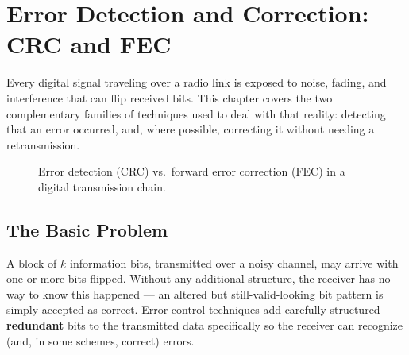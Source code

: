 \chapter{Error Detection and Correction: CRC and FEC}
\label{ch:error-control}

Every digital signal traveling over a radio link is exposed to noise,
fading, and interference that can flip received bits. This chapter
covers the two complementary families of techniques used to deal with
that reality: detecting that an error occurred, and, where possible,
correcting it without needing a retransmission.

\begin{figure}[H]
\centering
{}
\caption{Error detection (CRC) vs.\ forward error correction (FEC) in a
digital transmission chain.}
\end{figure}

\section{The Basic Problem}

A block of $k$ information bits, transmitted over a noisy channel, may
arrive with one or more bits flipped. Without any additional structure,
the receiver has no way to know this happened --- an altered but
still-valid-looking bit pattern is simply accepted as correct. Error
control techniques add carefully structured \textbf{redundant} bits to
the transmitted data specifically so the receiver can recognize (and, in
some schemes, correct) errors.

